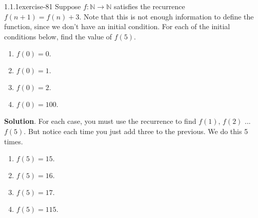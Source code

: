 \documentclass[twoside,11pt,]{book}
\numberwithin{equation}{chapter}
\newcommand{\N}{\mathbb N}
\begin{document}
\begin{divisionsolution}{1.1.1}{}{exercise-81}%
\hypertarget{p-1272}{}%
Suppose \(f:\N \to \N\) satisfies the recurrence \(f(n+1) = f(n) + 3\text{.}\) Note that this is not enough information to define the function, since we don't have an initial condition. For each of the initial conditions below, find the value of \(f(5)\text{.}\)\leavevmode%
\begin{enumerate}[label=(\alph*)]
\item\hypertarget{li-956}{}\hypertarget{p-1273}{}%
\(f(0) = 0\text{.}\)%
\item\hypertarget{li-957}{}\hypertarget{p-1274}{}%
\(f(0) = 1\text{.}\)%
\item\hypertarget{li-958}{}\hypertarget{p-1275}{}%
\(f(0) = 2\text{.}\)%
\item\hypertarget{li-959}{}\hypertarget{p-1276}{}%
\(f(0) = 100\text{.}\)%
\end{enumerate}
%
\par\smallskip%
\noindent\textbf{Solution}.\quad%
\hypertarget{p-1277}{}%
For each case, you must use the recurrence to find \(f(1)\text{,}\) \(f(2)\) ... \(f(5)\text{.}\) But notice each time you just add three to the previous. We do this 5 times.\leavevmode%
\begin{enumerate}[label=(\alph*)]
\item\hypertarget{li-960}{}\hypertarget{p-1278}{}%
\(f(5) = 15\text{.}\)%
\item\hypertarget{li-961}{}\hypertarget{p-1279}{}%
\(f(5) = 16\text{.}\)%
\item\hypertarget{li-962}{}\hypertarget{p-1280}{}%
\(f(5) = 17\text{.}\)%
\item\hypertarget{li-963}{}\hypertarget{p-1281}{}%
\(f(5) = 115\text{.}\)%
\end{enumerate}
%
\end{divisionsolution}%
\end{document}

